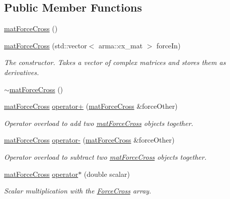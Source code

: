 \subsection*{Public Member Functions}
\begin{DoxyCompactItemize}
\item 
\hyperlink{classosea_1_1ofreq_1_1mat_force_cross_a8ceccb692bece20135f104f2f78dcf20}{mat\-Force\-Cross} ()
\item 
\hyperlink{classosea_1_1ofreq_1_1mat_force_cross_a7887135f4a9ee649d161ca5ca649675f}{mat\-Force\-Cross} (std\-::vector$<$ arma\-::cx\-\_\-mat $>$ force\-In)
\begin{DoxyCompactList}\small\item\em The constructor. Takes a vector of complex matrices and stores them as derivatives. \end{DoxyCompactList}\item 
\hyperlink{classosea_1_1ofreq_1_1mat_force_cross_a2eb0a76db0d4f994287d8368699bb036}{$\sim$mat\-Force\-Cross} ()
\item 
\hyperlink{classosea_1_1ofreq_1_1mat_force_cross}{mat\-Force\-Cross} \hyperlink{classosea_1_1ofreq_1_1mat_force_cross_a9cb8a17edf38bebb728ff47261175614}{operator+} (\hyperlink{classosea_1_1ofreq_1_1mat_force_cross}{mat\-Force\-Cross} \&force\-Other)
\begin{DoxyCompactList}\small\item\em Operator overload to add two \hyperlink{classosea_1_1ofreq_1_1mat_force_cross}{mat\-Force\-Cross} objects together. \end{DoxyCompactList}\item 
\hyperlink{classosea_1_1ofreq_1_1mat_force_cross}{mat\-Force\-Cross} \hyperlink{classosea_1_1ofreq_1_1mat_force_cross_af22b49c1536dc753f99b34a3eba1c8e7}{operator-\/} (\hyperlink{classosea_1_1ofreq_1_1mat_force_cross}{mat\-Force\-Cross} \&force\-Other)
\begin{DoxyCompactList}\small\item\em Operator overload to subtract two \hyperlink{classosea_1_1ofreq_1_1mat_force_cross}{mat\-Force\-Cross} objects together. \end{DoxyCompactList}\item 
\hyperlink{classosea_1_1ofreq_1_1mat_force_cross}{mat\-Force\-Cross} \hyperlink{classosea_1_1ofreq_1_1mat_force_cross_a411f77659b011eb6a90270463ffab7f1}{operator$\ast$} (double scalar)
\begin{DoxyCompactList}\small\item\em Scalar multiplication with the \hyperlink{classosea_1_1ofreq_1_1_force_cross}{Force\-Cross} array. \end{DoxyCompactList}\item 

\end{DoxyCompactItemize}
